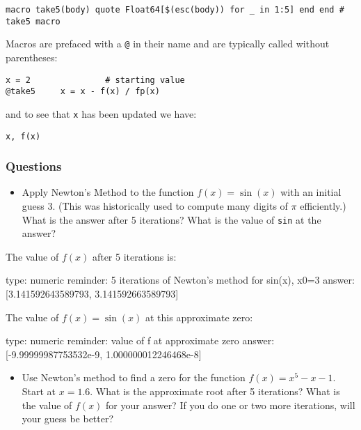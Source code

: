 \documentclass[12pt]{article}
\begin{document}
\begin{verbatim}
macro take5(body) quote Float64[$(esc(body)) for _ in 1:5] end end # take5 macro
\end{verbatim}
Macros are prefaced with a \texttt{@} in their name and are typically
called without parentheses:



\begin{verbatim}
x = 2               # starting value
@take5     x = x - f(x) / fp(x)
\end{verbatim}
and to see that \texttt{x} has been updated we have:



\begin{verbatim}
x, f(x)
\end{verbatim}
\subsubsection{Questions}

\begin{itemize}
\itemsep1pt\parskip0pt
\item
  Apply Newton's Method to the function $f(x) = \sin(x)$ with an initial
  guess $3$. (This was historically used to compute many digits of $\pi$
  efficiently.) What is the answer after 5 iterations? What is the value
  of \texttt{sin} at the answer?
\end{itemize}

The value of $f(x)$ after 5 iterations is:

\begin{answer}
    type: numeric
    reminder: 5 iterations of Newton's method for sin(x), x0=3
    answer: [3.141592643589793, 3.141592663589793]

\end{answer}

The value of $f(x)=\sin(x)$ at this approximate zero:

\begin{answer}
    type: numeric
    reminder: value of f at approximate zero
    answer: [-9.99999987753532e-9, 1.000000012246468e-8]

\end{answer}

\begin{itemize}
\itemsep1pt\parskip0pt
\item
  Use Newton's method to find a zero for the function $f(x)=x^5-x-1$.
  Start at $x=1.6$. What is the approximate root after 5 iterations?
  What is the value of $f(x)$ for your answer? If you do one or two more
  iterations, will your guess be better?
\end{itemize}
\end{document}
